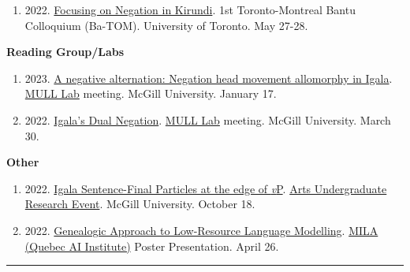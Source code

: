 \documentclass[margin,line]{resume}
\begin{document}
\begin{resume}
\begin{enumerate}[-, leftmargin=1em, topsep=4pt]
		\item[] {2022. \href{https://mcling.blogs.mcgill.ca/2022/05/24/mcgill-at-ba-tom-1/}{Focusing on Negation in Kirundi}. 1st Toronto-Montreal Bantu Colloquium (Ba-TOM). University of Toronto. May 27-28.}
	\end{enumerate}

	\newpage

	\textbf{Reading Group/Labs}
	\begin{enumerate}[-, leftmargin=1em, topsep=4pt]
		\item[] {2023. \href{https://mcling.blogs.mcgill.ca/2023/01/15/mull-lab-1-17-brandon-chaperon/}{A negative alternation: Negation head movement allomorphy in Igala}. \href{https://mull-lab.org/}{MULL Lab} meeting. McGill University. January 17.}

		\item[] {2022. \href{https://mcling.blogs.mcgill.ca/2022/03/27/mull-lab-03-30-brandon-chaperon/}{Igala's Dual Negation}. \href{https://mull-lab.org/}{MULL Lab} meeting. McGill University. March 30.}
	\end{enumerate}

	\textbf{Other}
	\begin{enumerate}[-, leftmargin=1em, topsep=4pt]
		\item[] {2022. \href{https://www.mcgill.ca/arts-internships/files/arts-internships/brandon_chaperon.pdf}{Igala Sentence-Final Particles at the edge of \textit{v}P}. \href{https://www.mcgill.ca/arts-internships/events-0/#block-bean-annual-faculty-of-arts-undergrad}{Arts Undergraduate Research Event}. McGill University. October 18.}

		\item[] {2022. \href{https://github.com/dopestdope123/LING484-Final-Projects}{Genealogic Approach to Low-Resource Language Modelling}. \href{https://mila.quebec/en/}{MILA (Quebec AI Institute)} Poster Presentation. April 26.}

	\end{enumerate}


	\vspace{-0.6em}\rule{\textwidth}{0.4pt}


	\begin{comment}
	\section{\mysidestyle Teaching}

	\href{https://www.mcgill.ca/study/2023-2024/courses/ling-410}{LING 410 - Structure of Wolof} undergraduate class for \href{https://inamartinovic.com/}{Martina Martinović}.\\
	McGill University.
	\hfill Feb 28 2024


\end{comment}
\end{resume}
\end{document}
